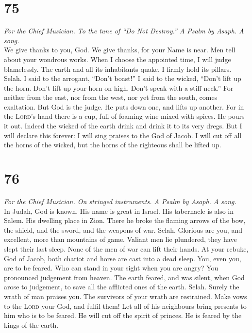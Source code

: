 \hypertarget{section-74}{%
\section{75}\label{section-74}}

\emph{For the Chief Musician. To the tune of ``Do Not Destroy.'' A Psalm
by Asaph. A song.}\\
 We give thanks to you, God. We give thanks, for your Name
is near. Men tell about your wondrous works.  When I
choose the appointed time, I will judge blamelessly.  The
earth and all its inhabitants quake. I firmly hold its pillars. Selah.
 I said to the arrogant, ``Don't boast!'' I said to the
wicked, ``Don't lift up the horn.  Don't lift up your horn
on high. Don't speak with a stiff neck.''  For neither
from the east, nor from the west, nor yet from the south, comes
exaltation.  But God is the judge. He puts down one, and
lifts up another.  For in the \textsc{Lord}'s hand there
is a cup, full of foaming wine mixed with spices. He pours it out.
Indeed the wicked of the earth drink and drink it to its very dregs.
 But I will declare this forever: I will sing praises to
the God of Jacob.  I will cut off all the horns of the
wicked, but the horns of the righteous shall be lifted up.

\hypertarget{section-75}{%
\section{76}\label{section-75}}

\emph{For the Chief Musician. On stringed instruments. A Psalm by Asaph.
A song.}\\
 In Judah, God is known. His name is great in Israel.
 His tabernacle is also in Salem. His dwelling place in
Zion.  There he broke the flaming arrows of the bow, the
shield, and the sword, and the weapons of war. Selah. 
Glorious are you, and excellent, more than mountains of game.
 Valiant men lie plundered, they have slept their last
sleep. None of the men of war can lift their hands.  At
your rebuke, God of Jacob, both chariot and horse are cast into a dead
sleep.  You, even you, are to be feared. Who can stand in
your sight when you are angry?  You pronounced judgement
from heaven. The earth feared, and was silent,  when God
arose to judgement, to save all the afflicted ones of the earth. Selah.
 Surely the wrath of man praises you. The survivors of
your wrath are restrained.  Make vows to the
\textsc{Lord} your God, and fulfil them! Let all of his neighbours bring
presents to him who is to be feared.  He will cut off the
spirit of princes. He is feared by the kings of the earth.

